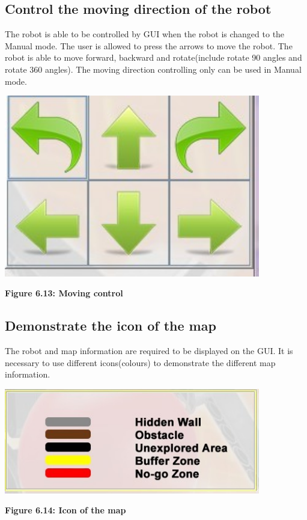\documentclass[11pt, a4paper]{report}
\begin{document}
\subsection{Control the moving direction of the robot}
The robot is able to be controlled by GUI when the robot is changed to the Manual mode. The user is allowed to press the arrows to move the robot. The robot is able to move forward, backward and rotate(include rotate 90 angles and rotate 360 angles). The moving direction controlling only can be used in Manual mode.
 \begin{center}
 \includegraphics[width=11.20cm]{ControlButton.jpg}
\end{center}
\begin{center}
\textbf {Figure 6.13: Moving control} \\[0.3cm]
\end{center}
\subsection{Demonstrate the icon of the map}
The robot and map information are required to be displayed on the GUI. It is necessary to use different icons(colours) to demonstrate the different map information.
  \begin{center}
 \includegraphics[width=11.20cm]{IconInformation.jpg}
\end{center}
\begin{center}
\textbf {Figure 6.14: Icon of the map} \\[0.3cm]
\end{center}
\end{document}
